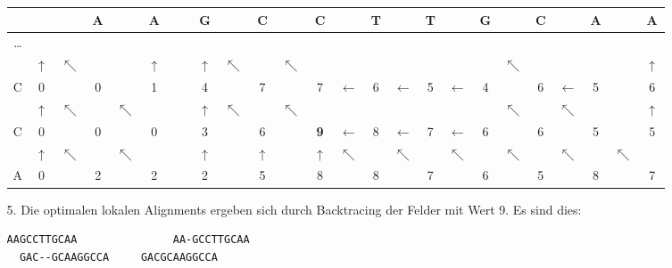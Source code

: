 \documentclass{homework}
\begin{document}
\begin{enumerate}
\begin{enumerate}
\begin{center}
\begin{tabular}{c|c@{}c@{}c@{}c@{}c@{}c@{}c@{}c@{}c@{}c@{}c@{}c@{}c@{}c@{}c@{}c@{}c@{}c@{}c@{}c@{}c@{}c@{}c}
& && A && A && G && C && C && T && T && G && C && A && A\\\hline
\ldots & & & & & & $\quad$ & & & & & & & & & & & & & & & &\\
& $\uparrow$ & $\nwarrow$ & & & $\uparrow$ & & $\uparrow$ & $\nwarrow$ & & $\nwarrow$ & & & & & & & & $\nwarrow$ & & & & & $\uparrow$\\
C & 0 && 0 && 1 && 4 && 7 && 7 & $\leftarrow$ & 6 & $\leftarrow$ & 5 & $\leftarrow$ & 4 && 6 & $\leftarrow$ & 5 && 6\\
& $\uparrow$ & $\nwarrow$ & & $\nwarrow$ & & & $\uparrow$ & $\nwarrow$ & & $\nwarrow$ & & & & & & & & $\nwarrow$ & & $\nwarrow$ & & & $\uparrow$\\
C & 0 && 0 && 0 && 3 && 6 && \textbf{9} & $\leftarrow$ & 8 & $\leftarrow$ & 7 & $\leftarrow$ & 6 && 6 && 5 && 5\\
& $\uparrow$ & $\nwarrow$ & & $\nwarrow$ & & & $\uparrow$ & & $\uparrow$ & & $\uparrow$ & $\nwarrow$ & & $\nwarrow$ & & $\nwarrow$ & & $\nwarrow$ & & $\nwarrow$ & & $\nwarrow$ &\\
A & 0 && 2 && 2 && 2 && 5 && 8 && 8 && 7 && 6 && 5 && 8 && 7
\end{tabular}
\end{center}

\item[5.] Die optimalen lokalen Alignments ergeben sich durch Backtracing der Felder mit Wert 9.
Es sind dies:

\begin{verbatim}
AAGCCTTGCAA               AA-GCCTTGCAA
  GAC--GCAAGGCCA     GACGCAAGGCCA
\end{verbatim}

\end{enumerate}


\end{enumerate}
\end{document}
